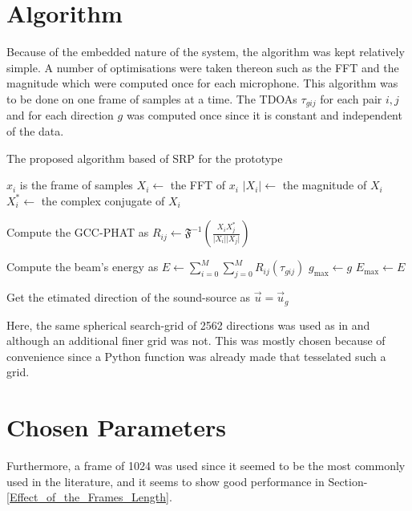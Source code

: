 \documentclass[notitlepage]{report}
\begin{document}
\section{Algorithm}

Because of the embedded nature of the system, the algorithm was kept relatively simple. A number of optimisations were taken thereon such as the FFT and the magnitude which were computed once for each microphone. This algorithm was to be done on one frame of samples at a time. The TDOAs $\tau_{gij}$ for each pair $i,j$ and for each direction $g$ was computed once since it is constant and independent of the data.

\begin{algorithm}[H]
\caption{The proposed algorithm based of SRP for the prototype}
\label{alg:proposed_algorithm}
\begin{algorithmic}
		\State $x_i$ is the frame of samples
		\State $X_i \gets$ the FFT of $x_i$
		\State $\lvert X_i \rvert \gets$ the magnitude of $X_i$
		\State $X_i^* \gets$ the complex conjugate of $X_i$
	\EndFor
	
		\State Compute the GCC-PHAT as 
		$R_{ij} \gets \mathfrak{F}^{-1} \left( \frac{X_i X_j^*}{\lvert X_i \rvert\lvert X_j \rvert} \right)$
	\EndFor
	
		\State Compute the beam's energy as 
		$E\gets \sum_{i=0}^{M} \sum_{j=0}^{M} R_{ij}(\tau_{gij})$
			\State $g_{\text{max}} \gets g$
			\State $E_{\text{max}} \gets E$
		\EndIf
	\EndFor
	
	\State Get the etimated direction of the sound-source as $\vec{u} = \vec{u}_g$
\end{algorithmic}
\end{algorithm} 

Here, the same spherical search-grid of 2562 directions was used as in \cite{valin_localization_2004} and \cite{valin_robust_2007} although an additional finer grid was not. This was mostly chosen because of convenience since a Python function was already made that tesselated such a grid.

\section{Chosen Parameters}

Furthermore, a frame of 1024 was used since it seemed to be the most commonly used in the literature, and it seems to show good performance in Section-\ref{Effect_of_the_Frames_Length}.
\end{document}
